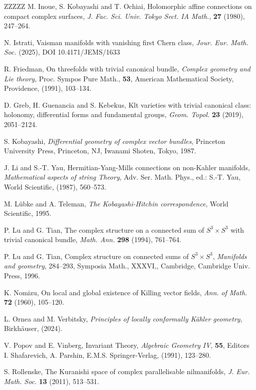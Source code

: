 \documentclass[12pt,reqno]{amsart}
\theoremstyle{definition}
\numberwithin{equation}{section}
\begin{document}
\begin{thebibliography}{ZZZZZ}
 M. Inoue, S. Kobayashi and T. Ochiai, Holomorphic affine connections on compact complex 
surfaces, {\it J. Fac. Sci. Univ. Tokyo Sect. IA Math.}, {\bf 27} (1980), 247--264.

 N. Istrati, Vaisman manifolds with vanishing first Chern class, {\it Jour. Eur. Math. 
Soc.} (2025), DOI 10.4171/JEMS/1633

 R. Friedman, On threefolds with trivial canonical bundle, {\it Complex geometry and Lie 
theory}, Proc. Sympos Pure Math., {\bf 53}, American Mathematical Society, Providence, (1991), 103--134.

 D. Greb, H. Guenancia and S. Kebekus, Klt varieties with trivial canonical class: 
holonomy, differential forms and fundamental groups, {\it Geom. Topol.} {\bf 23} (2019), 2051--2124.

 S. Kobayashi, \textit{Differential geometry of complex vector bundles}, Princeton 
University Press, Princeton, NJ, Iwanami Shoten, Tokyo, 1987.

 J. Li and S.-T. Yau, Hermitian-Yang-Mills connections on non-Kahler manifolds, 
\textit{Mathematical aspects of string Theory}, Adv. Ser. Math. Phys., ed.: S.-T. Yau,
 World Scientific, (1987), 560--573.

 M. L\"ubke and A. Teleman, \textit{The Kobayashi-Hitchin correspondence}, World 
Scientific, 1995.

 P. Lu and G. Tian, The complex structure on a connected sum of $S^3 \times S^3$ with 
trivial canonical bundle, {\it Math. Ann.} {\bf 298} (1994), 761--764.

 P. Lu and G. Tian, Complex structure on connected sums of $S^3 \times S^3$, {\it 
Manifolds and geometry}, 284--293, Symposia Math., XXXVI,, Cambridge, Cambridge Univ. Press, 1996.

 K. Nomizu, On local and global existence of Killing vector fields, \textit{Ann. of Math.} 
\textbf{72} (1960), 105--120.

 L. Ornea and M. Verbitsky, {\it Principles of locally conformally K\"ahler geometry}, Birkh\"auser, (2024).

 V. Popov and E. Vinberg, Invariant Theory, {\it Algebraic Geometry IV}, {\bf 55}, Editors 
I. Shafarevich, A. Parshin, E.M.S. Springer-Verlag, (1991), 123--280.

 S. Rollenske, The Kuranishi space of complex parallelisable nilmanifolds, {\it J. Eur. 
Math. Soc.} {\bf 13} (2011), 513--531.


\end{thebibliography}
\end{document}
